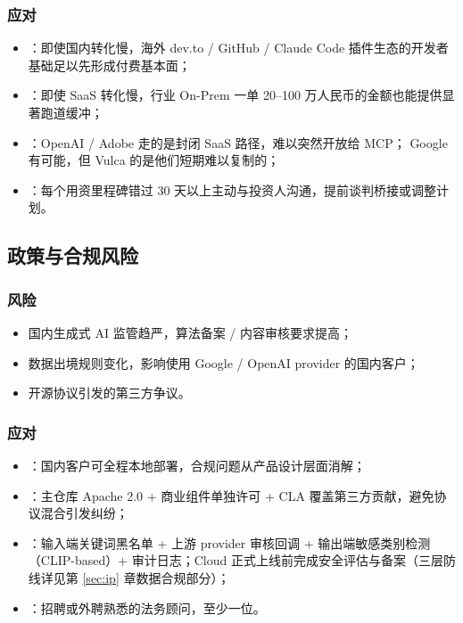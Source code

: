 \subsubsection*{应对}
\begin{itemize}
  \item {}：即使国内转化慢，海外 dev.to / GitHub / Claude Code 插件生态的开发者基础足以先形成付费基本面；
  \item {}：即使 SaaS 转化慢，行业 On-Prem 一单 20–100 万人民币的金额也能提供显著跑道缓冲；
  \item {}：OpenAI / Adobe 走的是封闭 SaaS 路径，难以突然开放给 MCP；
  Google 有可能，但 Vulca 的是他们短期难以复制的；
  \item {}：每个用资里程碑错过 30 天以上主动与投资人沟通，提前谈判桥接或调整计划。
\end{itemize}

\subsection{政策与合规风险}

\subsubsection*{风险}
\begin{itemize}
  \item 国内生成式 AI 监管趋严，算法备案 / 内容审核要求提高；
  \item 数据出境规则变化，影响使用 Google / OpenAI provider 的国内客户；
  \item 开源协议引发的第三方争议。
\end{itemize}

\subsubsection*{应对}
\begin{itemize}
  \item {}：国内客户可全程本地部署，合规问题从产品设计层面消解；
  \item {}：主仓库 Apache 2.0 + 商业组件单独许可 + CLA 覆盖第三方贡献，避免协议混合引发纠纷；
  \item {}：输入端关键词黑名单 + 上游 provider 审核回调 + 输出端敏感类别检测（CLIP-based）+ 审计日志；Cloud 正式上线前完成安全评估与备案（三层防线详见第 \ref{sec:ip} 章数据合规部分）；
  \item {}：招聘或外聘熟悉的法务顾问，至少一位。
\end{itemize}

